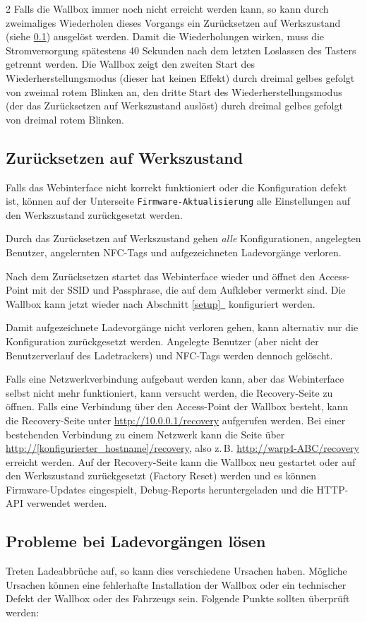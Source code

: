 \documentclass[a4paper,10pt]{article}
\newcommand{\hint}[1]{\begin{tcolorbox}[colback=boxgray,colframe=black,coltext=
white,title=Hinweis,left*=2mm,right*=2mm,boxsep=1mm,bottom=1mm,top=1mm]#1\end{tcolorbox}}
\newcommand*{\fullref}[1]{Abschnitt \hyperref[{#1}]{\ref*{#1}~\nameref*{#1}}}
\begin{document}
\begin{multicols*}{2}
    Falls die Wallbox immer noch nicht erreicht werden kann, so kann durch zweimaliges Wiederholen dieses Vorgangs ein Zurücksetzen auf Werkszustand (siehe \ref{reset}) ausgelöst werden.
    Damit die Wiederholungen wirken, muss die Stromversorgung spätestens 40 Sekunden nach dem letzten Loslassen des Tasters getrennt werden.
    Die Wallbox zeigt den zweiten Start des Wiederherstellungsmodus (dieser hat keinen Effekt) durch dreimal gelbes gefolgt von zweimal rotem Blinken an, den dritte Start des Wiederherstellungsmodus (der das Zurücksetzen auf Werkszustand auslöst) durch dreimal gelbes gefolgt von dreimal rotem Blinken. 

    \subsection{Zurücksetzen auf Werkszustand}\label{reset}
    Falls das Webinterface nicht korrekt funktioniert oder die Konfiguration defekt ist,
    können auf der Unterseite \texttt{Firmware-Aktualisierung} alle Einstellungen auf den Werkszustand zurückgesetzt werden.
    \hint{Durch das Zurücksetzen auf Werkszustand gehen \textit{alle} Konfigurationen, angelegten Benutzer, angelernten NFC-Tags und aufgezeichneten Ladevorgänge verloren.}
    Nach dem Zurücksetzen startet das Webinterface wieder und öffnet
    den Access-Point mit der SSID und Passphrase, die auf dem Aufkleber vermerkt
    sind. Die Wallbox kann jetzt wieder nach \fullref{setup} konfiguriert werden.

    Damit aufgezeichnete Ladevorgänge nicht verloren gehen, kann alternativ nur die Konfiguration zurückgesetzt werden.
    Angelegte Benutzer (aber nicht der Benutzerverlauf des Ladetrackers) und NFC-Tags werden dennoch gelöscht.

    Falls eine Netzwerkverbindung aufgebaut werden kann, aber das Webinterface
	selbst nicht mehr funktioniert, kann versucht werden, die Recovery-Seite zu öffnen.
    Falls eine Verbindung über den Access-Point der Wallbox besteht, kann
	die Recovery-Seite unter \url{http://10.0.0.1/recovery} aufgerufen werden. Bei einer bestehenden Verbindung zu einem Netzwerk kann die Seite über \url{http://[konfigurierter_hostname]/recovery}, also z.\,B. \url{http://warp4-ABC/recovery} erreicht werden.
    Auf der Recovery-Seite kann die Wallbox neu gestartet oder auf den Werkszustand zurückgesetzt (Factory Reset) werden und es können Firmware-Updates eingespielt, Debug-Reports
    heruntergeladen und die HTTP-API verwendet werden.

    \subsection{Probleme bei Ladevorgängen lösen}
    Treten Ladeabbrüche auf, so kann dies verschiedene Ursachen haben. Mögliche
    Ursachen können eine fehlerhafte Installation der Wallbox oder ein
    technischer Defekt der Wallbox oder des Fahrzeugs sein.
    Folgende Punkte sollten überprüft werden:


\end{multicols*}
\end{document}
